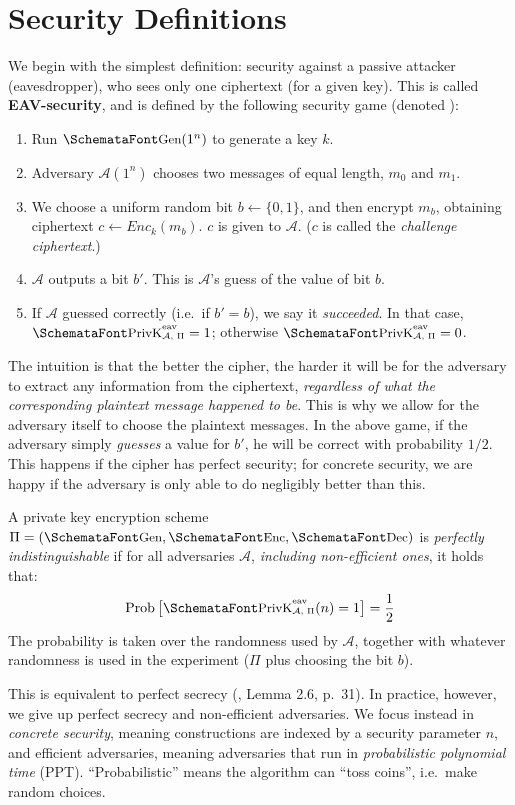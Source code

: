 \section{Security Definitions}
  \label{sec:secdefs}
  We begin with the simplest definition: security against a passive attacker (eavesdropper), who sees only one ciphertext (for a given key). This is called \textbf{EAV-security}, and is defined by the following security game (denoted \privkeav):
  \begin{enumerate}
    \item Run $\myemph{Gen}(1^n)$ to generate a key $k$.
    \item Adversary $\mathcal{A}(1^n)$ chooses two messages of equal length, $m_0$ and $m_1$.
    \item We choose a uniform random bit $b \leftarrow \{0, 1\}$, and then encrypt $m_b$, obtaining ciphertext $c \leftarrow Enc_k(m_b)$. $c$ is given to $\mathcal{A}$. ($c$ is called the \emph{challenge ciphertext}.)
    \item $\mathcal{A}$ outputs a bit $b'$. This is $\mathcal{A}$'s guess of the value of bit $b$.
    \item If $\mathcal{A}$ guessed correctly (i.e.\ if $b' = b$), we say it \emph{succeeded}. In that case, $\privkeav = 1$; otherwise $\privkeav = 0$. 
  \end{enumerate}
  The intuition is that the better the cipher, the harder it will be for the adversary to extract any information from the ciphertext, \emph{regardless of what the corresponding plaintext message happened to be}. This is why we allow for the adversary itself to choose the plaintext messages. In the above game, if the adversary simply \emph{guesses} a value for $b'$, he will be correct with probability $1/2$. This happens if the cipher has perfect security; for concrete security, we are happy if the adversary is only able to do negligibly better than this.
  \begin{definition}
    \label{def:perfectly_indistinguishable}
    A private key encryption scheme $\Pi = (\myemph{Gen}, \myemph{Enc}, \myemph{Dec})$ is \emph{perfectly indistinguishable} if for all adversaries $\mathcal{A}$, \emph{including non-efficient ones}, it holds that:
    \begin{equation}
      \textup{Prob}\left[\privkeav (n) = 1\right] = \frac{1}{2}
    \end{equation}
    The probability is taken over the randomness used by $\mathcal{A}$, together with whatever randomness is used in the experiment ($\Pi$ plus choosing the bit $b$).
  \end{definition}
  \noindent This is equivalent to perfect secrecy (\cite{KatzLindell:IMC}, Lemma 2.6, p.\ 31). In practice, however, we give up perfect secrecy and non-efficient adversaries. We focus instead in \emph{concrete security}, meaning constructions are indexed by a security parameter $n$, and efficient adversaries, meaning adversaries that run in \emph{probabilistic polynomial time} (PPT). ``Probabilistic'' means the algorithm can ``toss coins'', i.e.\ make random choices.

